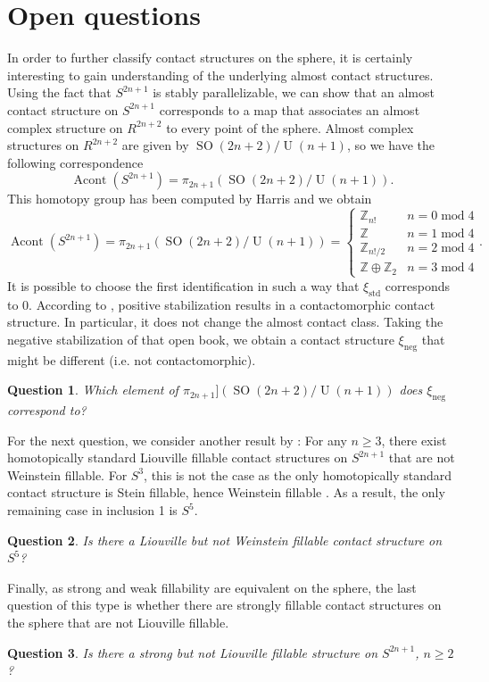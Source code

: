 \documentclass[a4paper]{amsart}
\newtheorem{question}{Question}
\begin{document}
\section*{Open questions}
In order to further classify contact structures on the sphere, it is certainly interesting to gain understanding of the underlying almost contact structures.
Using the fact that $S^{2n+1}$ is stably parallelizable, we can show that an almost contact structure on $S^{2n+1}$ corresponds to a map that associates an almost complex structure on $R^{2n+2}$
to every point of the sphere.
Almost complex structures on $R^{2n+2}$ are given by $\operatorname{SO}(2n + 2)/\operatorname{U}(n + 1)$, so we have the following correspondence
\[
    \operatorname{Acont}\left(S^{2n+1}\right) = \pi_{2n+1}(\operatorname{SO}(2n + 2)/\operatorname{U}(n + 1)).
\]
This homotopy group has been computed by Harris \cite{Harris63} and we obtain
\[
    \operatorname{Acont}\left(S^{2n+1}\right) = \pi_{2n+1}(\operatorname{SO}(2n + 2)/\operatorname{U}(n + 1)) = \begin{cases}
        \mathbb Z_{n!} &n = 0 \operatorname{mod} 4\\
        \mathbb Z &n = 1 \operatorname{mod} 4\\
        \mathbb Z_{n!/2} &n = 2 \operatorname{mod} 4\\
        \mathbb Z \oplus \mathbb Z_2 &n = 3 \operatorname{mod} 4
    \end{cases}.
\]
It is possible to choose the first identification in such a way that $\xi_{\mathrm{std}}$ corresponds to $0$.
According to \cite{Giroux02}, positive stabilization results in a contactomorphic
contact structure. In particular, it does not change the almost contact class.
Taking the negative stabilization of that open book, we obtain a contact structure $\xi_\mathrm{neg}$ that might be different (i.e. not contactomorphic).
\begin{question}
     Which element of $\pi_{2n+1}](\operatorname{SO}(2n + 2)/\operatorname{U}(n + 1))$ does $\xi_\mathrm{neg}$ correspond to?
\end{question}

For the next question, we consider another result by \cite{BGMZ22}: For any $n \geq 3$, there exist homotopically standard Liouville fillable contact structures on $S^{2n+1}$ that are not Weinstein fillable.
For $S^3$, this is not the case as the only homotopically standard contact structure is
Stein fillable, hence Weinstein fillable \cite{CE12}.
As a result, the only remaining case in inclusion 1 is $S^5$.
\begin{question}
Is there a Liouville but not Weinstein fillable contact structure on $S^5$? 
\end{question}
Finally, as strong and weak fillability are equivalent on the sphere,
the last question of this type is whether there are strongly fillable contact structures on the sphere that are not Liouville fillable.
\begin{question}
    Is there a strong but not Liouville fillable structure on $S^{2n+1}$, $n \ge 2$?
\end{question}
\newpage
\nocite{*}


\end{document}
